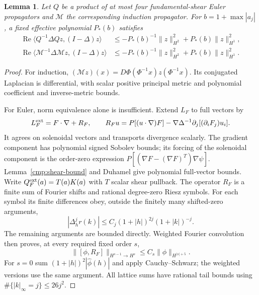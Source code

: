 \documentclass[11pt,a4paper]{amsart}
\newtheorem{lemma}[theorem]{Lemma}
\theoremstyle{definition}
\theoremstyle{remark}
\numberwithin{equation}{section}
\begin{document}
\begin{lemma}\label{cmp:garding}
Let $Q$ be a product of at most four fundamental-shear Euler propagators and
$\mathcal M$ the corresponding induction propagator. For
$b=1+\max|a_j|$, a fixed effective polynomial $P_*(b)$ satisfies
\begin{align}
 \operatorname{Re}\langle Q^{-1}\Delta Qz,(I-\Delta)z\rangle
 &\le-P_*(b)^{-1}\|z\|_{H^2}^2+P_*(b)\|z\|_{H^1}^2,
 \label{cmp:q-garding}\\
 \operatorname{Re}\langle\mathcal M^{-1}\Delta\mathcal Mz,
                                            (I-\Delta)z\rangle
 &\le-P_*(b)^{-1}\|z\|_{H^2}^2+P_*(b)\|z\|_{H^1}^2.
 \label{cmp:m-garding}
\end{align}
\end{lemma}
\begin{proof}
For induction, $(\mathcal Mz)(x)=D\Phi(\Phi^{-1}x)z(\Phi^{-1}x)$.
Its conjugated Laplacian is differential, with scalar positive principal
metric and polynomial coefficient and inverse-metric bounds.

For Euler, norm equivalence alone is insufficient. Extend $L_F$ to full
vectors by
\begin{equation}
 L_F^{\rm ext}=F\cdot\nabla+R_F,\qquad
 R_Fu=P[(u\cdot\nabla)F]
 -\nabla\Delta^{-1}\partial_j[(\partial_iF_j)u_i].
 \label{cmp:extension}
\end{equation}
It agrees on solenoidal vectors and transports divergence scalarly.
The gradient component has polynomial signed Sobolev bounds; its forcing
of the solenoidal component is the order-zero expression
$P[(\nabla F-(\nabla F)^T)\nabla\psi]$.
Lemma~\ref{cmp:shear-bound} and Duhamel give polynomial full-vector bounds.
Write $Q_F^{\rm ext}(a)=T(a)K(a)$ with $T$ scalar shear pullback.
The operator $R_F$ is a finite sum of Fourier shifts and rational degree-zero
Riesz symbols. For each symbol its finite differences obey, outside the
finitely many shifted-zero arguments,
\[
 |\Delta_h^j r(k)|\le C_j(1+|h|)^{2j}(1+|k|)^{-j}.
\]
The remaining arguments are bounded directly. Weighted Fourier convolution
then proves, at every required fixed order $s$,
\begin{equation}
 \|[\phi,R_F]\|_{H^{s-1}\to H^s}
 \le C_s\|\phi\|_{H^{|s|+5}}.\label{cmp:mult-comm}
\end{equation}
For $s=0$ sum $(1+|h|)^2|\widehat\phi(h)|$ and apply Cauchy--Schwarz;
the weighted versions use the same argument. All lattice sums have rational
tail bounds using $\#\{|k|_\infty=j\}\le26j^2$.


\end{proof}
\end{document}
